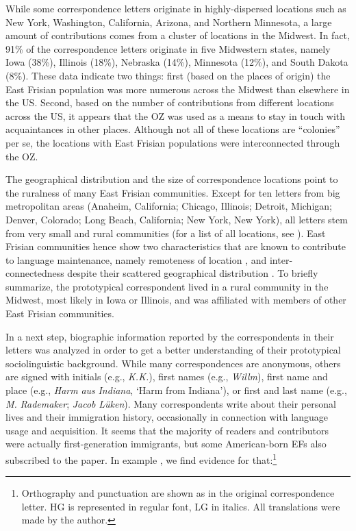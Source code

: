 \documentclass[output=paper]{langsci/langscibook}
\begin{document}
\begin{sloppypar}
While some correspondence letters originate in highly-dispersed locations such as New York, Washington, California, Arizona, and Northern Minnesota, a large amount of contributions comes from a cluster of locations in the Midwest. In fact, 91\% of the correspondence letters originate in five Midwestern states, namely Iowa (38\%), Illinois (18\%), Nebraska (14\%), Minnesota (12\%), and South Dakota (8\%). These data indicate two things: first (based on the places of origin) the East Frisian population was more numerous across the Midwest than elsewhere in the US. Second, based on the number of contributions from different locations across the US, it appears that the OZ was used as a means to stay in touch with acquaintances in other places. Although not all of these locations are “colonies” per se, the locations with East Frisian populations were interconnected through the OZ.
\end{sloppypar}

The geographical distribution and the size of correspondence locations point to the ruralness of many East Frisian communities. Except for ten letters from big metropolitan areas (Anaheim, California; Chicago, Illinois; Detroit, Michigan; Denver, Colorado; Long Beach, California; New York, New York), all letters stem from very small and rural communities (for a list of all locations, see ). East Frisian communities hence show two characteristics that are known to contribute to language maintenance, namely remoteness of location \citep{Louden2006}, and inter-connectedness despite their scattered geographical distribution \citep{Reschly2000}. To briefly summarize, the prototypical correspondent lived in a rural community in the Midwest, most likely in Iowa or Illinois, and was affiliated with members of other East Frisian communities.

In a next step, biographic information reported by the correspondents in their letters was analyzed in order to get a better understanding of their prototypical sociolinguistic background. While many correspondences are anonymous, others are signed with initials (e.g., \textit{K.K.}), first names (e.g., \textit{Willm}), first name and place (e.g., \textit{Harm} \textit{aus} \textit{Indiana}, ‘Harm from Indiana’), or first and last name (e.g., \textit{M.} \textit{Rademaker}; \textit{Jacob} \textit{Lüken}). Many correspondents write about their personal lives and their immigration history, occasionally in connection with language usage and acquisition. It seems that the majority of readers and contributors were actually first-generation immigrants, but some American-born EFs also subscribed to the paper. In example , we find evidence for that:\footnote{Orthography and punctuation are shown as in the original correspondence letter. HG is represented in regular font, LG in italics. All translations were made by the author.}
\end{document}
